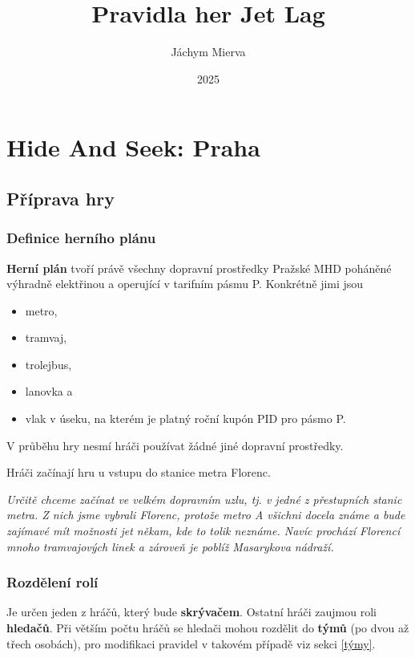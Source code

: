 \documentclass{book}
\title{Pravidla her Jet Lag}
\author{Jáchym Mierva}
\date{2025}
\newenvironment{reasoning}{\begin{small}\itshape}{\end{small}}
\begin{document}
\maketitle
\tableofcontents

\chapter{Hide And Seek: Praha}

\section{Příprava hry}

\subsection{Definice herního plánu}\label{herní plán}

\textbf{Herní plán} tvoří právě všechny dopravní prostředky Pražské MHD poháněné výhradně elektřinou a operující v tarifním pásmu P. Konkrétně jimi jsou
\begin{itemize}
	\item metro,
	\item tramvaj,
	\item trolejbus,
	\item lanovka a
	\item vlak v úseku, na kterém je platný roční kupón PID pro pásmo P.
\end{itemize}
V průběhu hry nesmí hráči používat žádné jiné dopravní prostředky.

Hráči začínají hru u vstupu do stanice metra Florenc.

\begin{reasoning}
	Určitě chceme začínat ve velkém dopravním uzlu, tj. v jedné z přestupních stanic metra. Z nich jsme vybrali Florenc, protože metro A všichni docela známe a bude zajímavé mít možnosti jet někam, kde to tolik neznáme. Navíc prochází Florencí mnoho tramvajových linek a zároveň je poblíž Masarykova nádraží.
\end{reasoning}

\subsection{Rozdělení rolí}

Je určen jeden z hráčů, který bude \textbf{skrývačem}. Ostatní hráči zaujmou roli \textbf{hledačů}. Při větším počtu hráčů se hledači mohou rozdělit do \textbf{týmů} (po dvou až třech osobách), pro modifikaci pravidel v takovém případě viz sekci \ref{týmy}.
\end{document}
